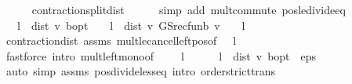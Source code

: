 \begin{isabellebody}
\ \ \ \ \isamarkupfalse%
\ contraction{\isacharunderscore}{\kern0pt}{\isasymL}{\isacharunderscore}{\kern0pt}split{\isacharunderscore}{\kern0pt}dist\isanewline
\ \ \ \ \isamarkupfalse%
\ {\isacharparenleft}{\kern0pt}simp\ add{\isacharcolon}{\kern0pt}\ mult{\isachardot}{\kern0pt}commute\ pos{\isacharunderscore}{\kern0pt}le{\isacharunderscore}{\kern0pt}divide{\isacharunderscore}{\kern0pt}eq{\isacharparenright}{\kern0pt}\isanewline
\ \ \isamarkupfalse%
\ {\isachardoublequoteopen}{}\ {\isacharasterisk}{\kern0pt}\ l\ {\isacharasterisk}{\kern0pt}\ dist\ v\ {\isasymnu}\isactrlsub b{\isacharunderscore}{\kern0pt}opt\ {\isasymle}\ {}\ {\isacharasterisk}{\kern0pt}\ l\ {\isacharasterisk}{\kern0pt}\ {\isacharparenleft}{\kern0pt}dist\ v\ {\isacharparenleft}{\kern0pt}GS{\isacharunderscore}{\kern0pt}rec{\isacharunderscore}{\kern0pt}fun\isactrlsub b\ v{\isacharparenright}{\kern0pt}\ {\isacharslash}{\kern0pt}\ {\isacharparenleft}{\kern0pt}{}\ {\isacharminus}{\kern0pt}\ l{\isacharparenright}{\kern0pt}{\isacharparenright}{\kern0pt}{\isachardoublequoteclose}\isanewline
\ \ \ \ \isamarkupfalse%
\ contraction{\isacharunderscore}{\kern0pt}{\isasymL}{\isacharunderscore}{\kern0pt}dist\ assms\ mult{\isacharunderscore}{\kern0pt}le{\isacharunderscore}{\kern0pt}cancel{\isacharunderscore}{\kern0pt}left{\isacharunderscore}{\kern0pt}pos{\isacharbrackleft}{\kern0pt}of\ {\isachardoublequoteopen}{}\ {\isacharasterisk}{\kern0pt}\ l{\isachardoublequoteclose}{\isacharbrackright}{\kern0pt}\isanewline
\ \ \ \ \isamarkupfalse%
\ {\isacharparenleft}{\kern0pt}fastforce\ intro{\isacharbang}{\kern0pt}{\isacharcolon}{\kern0pt}\ mult{\isacharunderscore}{\kern0pt}left{\isacharunderscore}{\kern0pt}mono{\isacharbrackleft}{\kern0pt}of\ {\isacharunderscore}{\kern0pt}\ {\isacharunderscore}{\kern0pt}\ {\isachardoublequoteopen}{}\ {\isacharasterisk}{\kern0pt}\ l{\isachardoublequoteclose}{\isacharbrackright}{\kern0pt}{\isacharparenright}{\kern0pt}\isanewline
\ \ \isamarkupfalse%
\ {\isachardoublequoteopen}{}\ {\isacharasterisk}{\kern0pt}\ l\ {\isacharasterisk}{\kern0pt}\ dist\ v\ {\isasymnu}\isactrlsub b{\isacharunderscore}{\kern0pt}opt\ {\isacharless}{\kern0pt}\ eps{\isachardoublequoteclose}\isanewline
\ \ \ \ \isamarkupfalse%
\ {\isacharparenleft}{\kern0pt}auto\ simp{\isacharcolon}{\kern0pt}\ assms{\isacharparenleft}{\kern0pt}{}{\isacharparenright}{\kern0pt}\ pos{\isacharunderscore}{\kern0pt}divide{\isacharunderscore}{\kern0pt}less{\isacharunderscore}{\kern0pt}eq\ intro{\isacharcolon}{\kern0pt}\ order{\isachardot}{\kern0pt}strict{\isacharunderscore}{\kern0pt}trans{}{\isacharparenright}{\kern0pt}\isanewline

\end{isabellebody}
